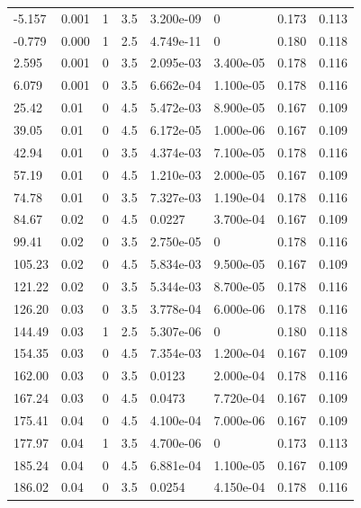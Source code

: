 \documentclass[preview]{standalone}
\begin{document}
{{\begin{tabular}{L{1.2cm}C{1.2cm} C{0.3cm}C{0.5cm} C{1.4cm}C{1.4cm} C{1.4cm}C{1.4cm}}
  -5.157  &  0.001  & 1     & 3.5 &  3.200e-09  & 0  & 0.173 &  0.113   \\ 
  -0.779  &  0.000  & 1     & 2.5 &  4.749e-11  & 0  & 0.180 &  0.118   \\ 
  2.595  &  0.001  & 0     & 3.5 &  2.095e-03  & 3.400e-05  & 0.178 &  0.116   \\ 
  6.079  &  0.001  & 0     & 3.5 &  6.662e-04  & 1.100e-05  & 0.178 &  0.116   \\ 
  25.42  &  0.01  & 0     & 4.5 &  5.472e-03  & 8.900e-05  & 0.167 &  0.109   \\ 
  39.05  &  0.01  & 0     & 4.5 &  6.172e-05  & 1.000e-06  & 0.167 &  0.109   \\ 
  42.94  &  0.01  & 0     & 3.5 &  4.374e-03  & 7.100e-05  & 0.178 &  0.116   \\ 
  57.19  &  0.01  & 0     & 4.5 &  1.210e-03  & 2.000e-05  & 0.167 &  0.109   \\ 
  74.78  &  0.01  & 0     & 3.5 &  7.327e-03  & 1.190e-04  & 0.178 &  0.116   \\ 
  84.67  &  0.02  & 0     & 4.5 &  0.0227  & 3.700e-04  & 0.167 &  0.109   \\ 
  99.41  &  0.02  & 0     & 3.5 &  2.750e-05  & 0  & 0.178 &  0.116   \\ 
  105.23  &  0.02  & 0     & 4.5 &  5.834e-03  & 9.500e-05  & 0.167 &  0.109   \\ 
  121.22  &  0.02  & 0     & 3.5 &  5.344e-03  & 8.700e-05  & 0.178 &  0.116   \\ 
  126.20  &  0.03  & 0     & 3.5 &  3.778e-04  & 6.000e-06  & 0.178 &  0.116   \\ 
  144.49  &  0.03  & 1     & 2.5 &  5.307e-06  & 0  & 0.180 &  0.118   \\ 
  154.35  &  0.03  & 0     & 4.5 &  7.354e-03  & 1.200e-04  & 0.167 &  0.109   \\ 
  162.00  &  0.03  & 0     & 3.5 &  0.0123  & 2.000e-04  & 0.178 &  0.116   \\ 
  167.24  &  0.03  & 0     & 4.5 &  0.0473  & 7.720e-04  & 0.167 &  0.109   \\ 
  175.41  &  0.04  & 0     & 4.5 &  4.100e-04  & 7.000e-06  & 0.167 &  0.109   \\ 
  177.97  &  0.04  & 1     & 3.5 &  4.700e-06  & 0  & 0.173 &  0.113   \\ 
  185.24  &  0.04  & 0     & 4.5 &  6.881e-04  & 1.100e-05  & 0.167 &  0.109   \\ 
  186.02  &  0.04  & 0     & 3.5 &  0.0254  & 4.150e-04  & 0.178 &  0.116   \\ 

\end{tabular}}}
\end{document}

